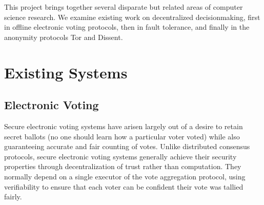%
%
%
This project brings together several disparate but related areas of computer
science research. We examine existing work on decentralized decisionmaking,
first in offline electronic voting protocols, then in fault tolerance, and
finally in the anonymity protocols Tor and Dissent.
%
\section{Existing Systems}
  \subsection{Electronic Voting} \label{Subsection:evoting}
    Secure electronic voting systems have arisen largely out of a desire to
    retain secret ballots (no one should learn how a particular voter voted)
    while also guaranteeing accurate and fair counting of votes. Unlike
    distributed consensus protocols, secure electronic voting systems generally
    achieve their security properties through decentralization of trust rather
    than computation. They normally depend on a single executor of the vote
    aggregation protocol, using verifiability to ensure that each voter can be
    confident their vote was tallied fairly.

